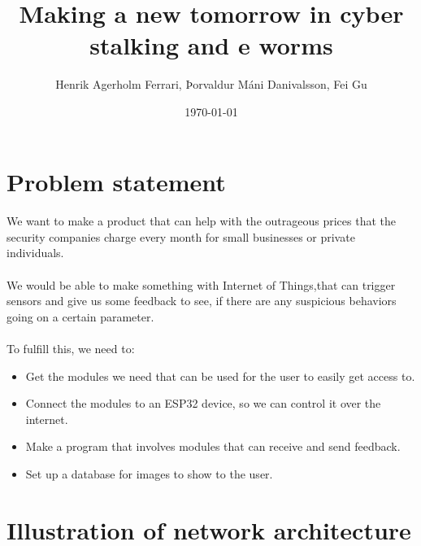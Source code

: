 \documentclass[a4paper, 12pt]{article}        %
\title{Making a new tomorrow in cyber stalking and e worms}                                   %
\author{Henrik Agerholm Ferrari, Þorvaldur Máni Danivalsson, Fei Gu}
\date{\today}
\begin{document}

    \maketitle
    \tableofcontents

    \pagebreak
    \section{Problem statement}\label{sec:problem-statement}

    \paragraph{}
    We want to make a product that can help with the outrageous prices that the security companies charge every
    month for small businesses or private individuals.

    \paragraph{}
    We would be able to make something with Internet of Things,that can trigger sensors and give us some feedback
    to see, if there are any suspicious behaviors going on a certain parameter.

    \paragraph{}
    To fulfill this, we need to:

    \begin{itemize}

        \item Get the modules we need that can be used for the user to easily get access to.

        \item Connect the modules to an ESP32 device, so we can control it over the internet.

        \item Make a program that involves modules that can receive and send feedback.

        \item Set up a database for images to show to the user.

    \end{itemize}

    \section{Illustration of network architecture}\label{sec:illustration-of-network-architecture}
\end{document}
